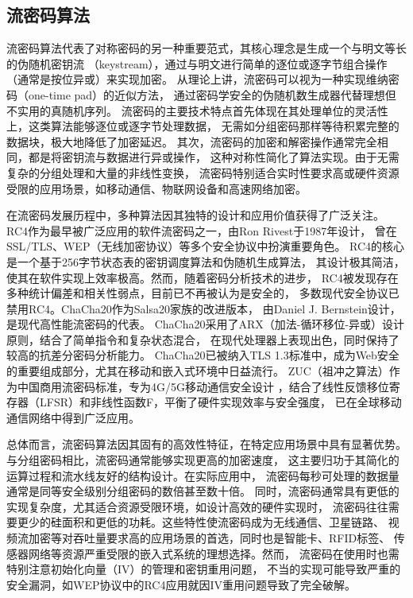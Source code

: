 \subsection{流密码算法}
流密码算法代表了对称密码的另一种重要范式，其核心理念是生成一个与明文等长的伪随机密钥流
（keystream），通过与明文进行简单的逐位或逐字节组合操作（通常是按位异或）来实现加密。
从理论上讲，流密码可以视为一种实现维纳密码（one-time pad）的近似方法，
通过密码学安全的伪随机数生成器代替理想但不实用的真随机序列。
流密码的主要技术特点首先体现在其处理单位的灵活性上，这类算法能够逐位或逐字节处理数据，
无需如分组密码那样等待积累完整的数据块，极大地降低了加密延迟。
其次，流密码的加密和解密操作通常完全相同，都是将密钥流与数据进行异或操作，
这种对称性简化了算法实现。由于无需复杂的分组处理和大量的非线性变换，
流密码特别适合实时性要求高或硬件资源受限的应用场景，如移动通信、物联网设备和高速网络加密。

在流密码发展历程中，多种算法因其独特的设计和应用价值获得了广泛关注。
RC4作为最早被广泛应用的软件流密码之一，由Ron Rivest于1987年设计，
曾在SSL/TLS、WEP（无线加密协议）等多个安全协议中扮演重要角色。
RC4的核心是一个基于256字节状态表的密钥调度算法和伪随机生成算法，
其设计极其简洁，使其在软件实现上效率极高。然而，随着密码分析技术的进步，
RC4被发现存在多种统计偏差和相关性弱点，目前已不再被认为是安全的，
多数现代安全协议已禁用RC4。ChaCha20作为Salsa20家族的改进版本，
由Daniel J. Bernstein设计，是现代高性能流密码的代表。
ChaCha20采用了ARX（加法-循环移位-异或）设计原则，结合了简单指令和复杂状态混合，
在现代处理器上表现出色，同时保持了较高的抗差分密码分析能力。
ChaCha20已被纳入TLS 1.3标准中，成为Web安全的重要组成部分，尤其在移动和嵌入式环境中日益流行。
ZUC（祖冲之算法）作为中国商用流密码标准，专为4G/5G移动通信安全设计
，结合了线性反馈移位寄存器（LFSR）和非线性函数F，平衡了硬件实现效率与安全强度，
已在全球移动通信网络中得到广泛应用。

总体而言，流密码算法因其固有的高效性特征，在特定应用场景中具有显著优势。
与分组密码相比，流密码通常能够实现更高的加密速度，
这主要归功于其简化的运算过程和流水线友好的结构设计。在实际应用中，
流密码每秒可处理的数据量通常是同等安全级别分组密码的数倍甚至数十倍。
同时，流密码通常具有更低的实现复杂度，尤其适合资源受限环境，如设计高效的硬件实现时，
流密码往往需要更少的硅面积和更低的功耗。这些特性使流密码成为无线通信、卫星链路、
视频流加密等对吞吐量要求高的应用场景的首选，同时也是智能卡、RFID标签、
传感器网络等资源严重受限的嵌入式系统的理想选择。然而，
流密码在使用时也需特别注意初始化向量（IV）的管理和密钥重用问题，
不当的实现可能导致严重的安全漏洞，如WEP协议中的RC4应用就因IV重用问题导致了完全破解。

